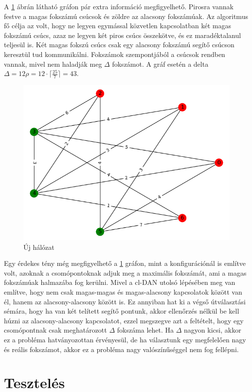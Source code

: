 \documentclass[12pt]{report}
\begin{document}
A \ref{routing-scheme} ábrán látható gráfon pár extra információ megfigyelhető. 
Pirosra vannak festve a magas fokszámú csúcsok és zöldre az alacsony fokszámúak.
Az algoritmus fő célja az volt, hogy ne legyen egymással közvetlen kapcsolatban két magas fokszámú csúcs, azaz ne legyen két piros csúcs összekötve, és ez maradéktalanul teljesül is.
Két magas fokszú csúcs csak egy alacsony fokszámú segítő csúcson keresztül tud kommunikálni.
Fokszámok szempontjából a csúcsok rendben vannak, mivel nem haladják meg $\Delta$ fokszámot. 
A gráf esetén a delta \(\Delta = 12\rho = 12 \cdot \lceil\frac{25}{7}\rceil = 43  \).

\begin{figure}[H]
	\begin{center}
		\includegraphics[width=0.49\linewidth]{pictures/new_network.png}
		\caption{Új hálózat}
		\label{routing-scheme}
	\end{center}
\end{figure}

Egy érdekes tény még megfigyelhető a \ref{routing-scheme} gráfon, mint a konfigurációnál is említve volt, azoknak a csomópontoknak adjuk meg a maximális fokszámát, ami a magas fokszámúak halmazába fog kerülni. 
Mivel a cl-DAN utolsó lépésében meg van említve, hogy nem csak magas-magas és magas-alacsony kapcsolatok között van él, hanem az alacsony-alacsony között is.
Ez annyiban hat ki a végső útválasztási sémára, hogy ha van két telített segítő pontunk, akkor ellenőrzés nélkül be kell húzni az alacsony-alacsony kapcsolatot, ezzel megszegve azt a feltételt, hogy egy csomópontnak csak meghatározott $\Delta$ fokszáma lehet.
Ha $\Delta$ nagyon kicsi, akkor ez a probléma hatványozottan érvényesül, de ha választunk egy megfelelően nagy és reális fokszámot, akkor ez a probléma nagy valószínűséggel nem fog fellépni.
	


\chapter{Tesztelés}
\end{document}
